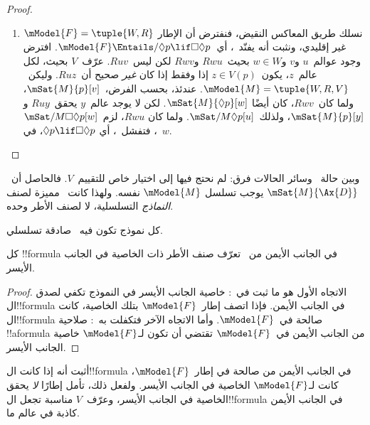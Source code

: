 \documentclass[../../../include/open-logic-section]{subfiles}
\begin{document}
\begin{proof}
\begin{enumerate}
    $\mSat{M}{p}[w]$؛ وبتعريف~$V$ لا يمكن هذا إلا إذا كان~$Ruw$، كما
    أُريد.
  \item نسلك طريق المعاكس النقيض، فنفترض أن الإطار
    $\mModel{F} = \tuple{W, R}$ غير إقليدي، ونثبت أنه يفنّد~،
    أي~$\mModel{F} \Entails/ \Diamond p \lif \Box\Diamond p$. افترض
    وجود عوالم~$u$ و$v$ و$w \in W$ بحيث~$Rwu$ و$Rwv$ لكن ليس~$Ruv$.
    عرّف~$V$ بحيث، لكل عالم~$z$، يكون~$z \in V(p)$ إذا وفقط إذا كان
    \emph{غير} صحيح أن~$Ruz$. وليكن~$\mModel{M} =\tuple{W, R, V}$.
    عندئذ، بحسب الفرض،~$\mSat{M}{p}[v]$، ولما كان~$Rwv$، كان أيضًا
    $\mSat{M}{\Diamond p}[w]$. لكن لا يوجد عالم~$y$ يحقق~$Ruy$ و
    $\mSat{M}{p}[y]$، ولذلك~$\mSat/{M}{\Diamond p}[u]$. ولما كان
    $Rwu$، لزم~$\mSat/{M}{\Box\Diamond p}[w]$، فتفشل~، أي
    $\Diamond p \lif \Box\Diamond p$، في~$w$.
  \end{enumerate}
\end{proof}

وبين حالة~ وسائر الحالات فرق: لم نحتج فيها إلى اختيار خاص
للتقييم~$V$. فالحاصل أن~$\mSat{M}{\Ax{D}}$ يوجب تسلسل
$\mModel{M}$ نفسه. ولهذا كانت~ مميزة لصنف \emph{النماذج}
التسلسلية، لا لصنف الأطر وحده.

\begin{cor}
  كل نموذج تكون فيه~ صادقة تسلسلي.
\end{cor}

\begin{cor}
كل !!{formula} في الجانب الأيمن من~ تعرّف صنف
الأطر ذات الخاصية في الجانب الأيسر.
\end{cor}

\begin{proof}
  الاتجاه الأول هو ما ثبت في~:
  خاصية الجانب الأيسر في النموذج تكفي لصدق ال!!{formula}
  في الجانب الأيمن. فإذا اتصف إطار~$\mModel{F}$ بتلك الخاصية،
  كانت ال!!{formula} صالحة في~$\mModel{F}$.
  وأما الاتجاه الآخر فتكفلت به~:
  صلاحية !!a{formula} من الجانب الأيمن في~$\mModel{F}$
  تقتضي أن تكون لـ$\mModel{F}$ خاصية الجانب الأيسر.
\end{proof}

\begin{prob}
أثبت أنه إذا كانت ال!!{formula} في الجانب الأيمن من
 صالحة في إطار~$\mModel{F}$،
كانت لـ$\mModel{F}$ الخاصية في الجانب الأيسر. ولفعل ذلك، تأمل إطارًا
\emph{لا} يحقق الخاصية في الجانب الأيسر، وعرّف~$V$ مناسبة تجعل
ال!!{formula} في الجانب الأيمن كاذبة في عالم ما.
\end{prob}
\end{document}
